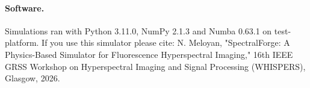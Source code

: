 \paragraph{Software.} Simulations ran with Python 3.11.0, NumPy 2.1.3 and Numba 0.63.1 on test-platform. If you use this simulator please cite: N. Meloyan, "SpectralForge: A Physics-Based Simulator for Fluorescence Hyperspectral Imaging," 16th IEEE GRSS Workshop on Hyperspectral Imaging and Signal Processing (WHISPERS), Glasgow, 2026.
